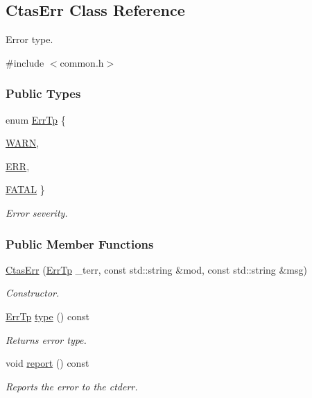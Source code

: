 \hypertarget{classCtasErr}{
\subsection{CtasErr Class Reference}
\label{classCtasErr}
}


Error type.  




{\ttfamily \#include $<$common.h$>$}

\subsubsection*{Public Types}
\begin{DoxyCompactItemize}
\item 
enum \hyperlink{classCtasErr_af961b70f6bb7cf20075131c79b049654}{ErrTp} \{ \par
\hyperlink{classCtasErr_af961b70f6bb7cf20075131c79b049654a79e18c2e2af3c0b01de4d1b303877697}{WARN}, 
\par
\hyperlink{classCtasErr_af961b70f6bb7cf20075131c79b049654a2730082bed1adb75fea32d2392df3f2b}{ERR}, 
\par
\hyperlink{classCtasErr_af961b70f6bb7cf20075131c79b049654a1f266c6ae424c0012c7507c416d936f1}{FATAL}
 \}
\begin{DoxyCompactList}\small\item\em Error severity. \item\end{DoxyCompactList}\end{DoxyCompactItemize}
\subsubsection*{Public Member Functions}
\begin{DoxyCompactItemize}
\item 
\hyperlink{classCtasErr_a0ce2e9de69c0de8528389267c5e139be}{CtasErr} (\hyperlink{classCtasErr_af961b70f6bb7cf20075131c79b049654}{ErrTp} \_\-terr, const std::string \&mod, const std::string \&msg)
\begin{DoxyCompactList}\small\item\em Constructor. \item\end{DoxyCompactList}\item 
\hyperlink{classCtasErr_af961b70f6bb7cf20075131c79b049654}{ErrTp} \hyperlink{classCtasErr_a29e66cdf8ef4dfe224ee287c6cf72d13}{type} () const 
\begin{DoxyCompactList}\small\item\em Returns error type. \item\end{DoxyCompactList}\item 
void \hyperlink{classCtasErr_a031589545d4a5c4c2d36913ce1b553c6}{report} () const 
\begin{DoxyCompactList}\small\item\em Reports the error to the ctderr. \item\end{DoxyCompactList}\end{DoxyCompactItemize}
